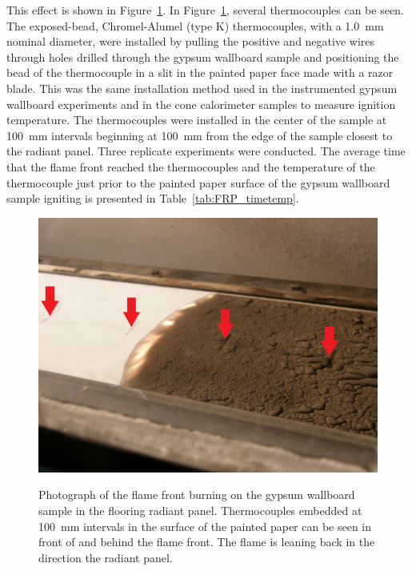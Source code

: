 \documentclass[twoside]{uocthesis}
\begin{document}
{This effect is shown in Figure~\ref{FRP_flamefront_arrows}. In Figure~\ref{FRP_flamefront_arrows}, several thermocouples can be seen. The exposed-bead, Chromel-Alumel (type K) thermocouples, with a 1.0~mm nominal diameter, were installed by pulling the positive and negative wires through holes drilled through the gypsum wallboard sample and positioning the bead of the thermocouple in a slit in the painted paper face made with a razor blade.  This was the same installation method used in the instrumented gypsum  wallboard experiments and in the cone calorimeter samples to measure ignition temperature.  The thermocouples were installed in the center of the sample at 100~mm intervals beginning at 100~mm from the edge of the sample closest to the radiant panel.  Three replicate experiments were conducted.  The average time that the flame front reached the thermocouples and the temperature of the thermocouple just prior to the painted paper surface of the gypsum wallboard sample igniting is presented in Table~\ref{tab:FRP_timetemp}.  

\begin{figure}
	\centering
	\includegraphics[width=\textwidth]{../Figures/FRP_flamefront_arrows} \\
	\caption[Photograph of the flame front burning on the gypsum wallboard sample in the flooring radiant panel] {Photograph of the flame front burning on the gypsum wallboard sample in the flooring radiant panel. Thermocouples embedded at 100~mm intervals in the surface of the painted paper can be seen in front of and behind the flame front. The flame is leaning back in the direction the radiant panel.}
	\label{FRP_flamefront_arrows}
\end{figure}

}
\end{document}
